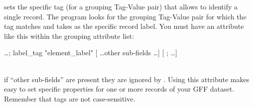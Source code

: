 %
   {  sets the specific tag (for a grouping Tag-Value pair) that allows to identify a single record. The program looks for the grouping Tag-Value pair for which the tag matches  and takes  as the specific record label. You must have an attribute like this within the grouping attribute list: \\[0.75ex] 
 \centerline{ \ldots ; label\_tag "element\_label" [ \ldots other sub-fields \ldots ] [ ; \ldots ] }\\[0.75ex] 
 if ``other sub-fields'' are present they are ignored by \prog. Using this attribute makes easy to set specific properties for one or more records of your GFF dataset. Remember that tags are not case-sensitive. }
%
   { {\tbdef} }
%
   { {\tbdef} }
%
   { {\tbdef} }
%
   { {\tbdef} }
%
   { {\tbdef} }
%
   { {\tbdef} }
%
   { {\tbdef} }
%
   { {\tbdef} }
%
   { {\tbdef} }
%
   { {\tbdef} }
%
   { {\tbdef} }
%
